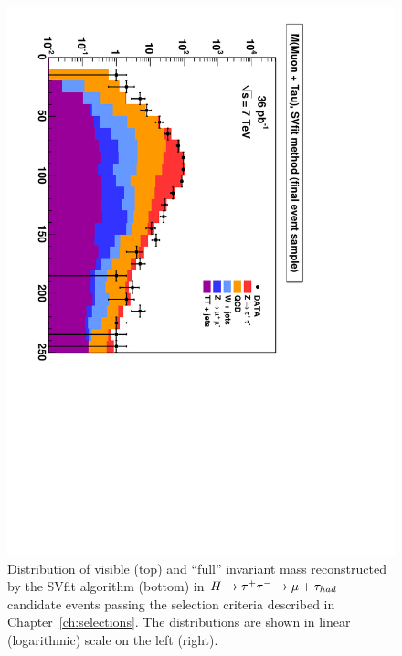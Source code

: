 \begin{figure}
\begin{center}
\includegraphics*[height=0.49\textwidth,angle=90]{results_chapter/figures/replotted_results/plotAHtoMuTauOS_inclusive_finalSamplePlots_mSVmethod.pdf}
\caption[Distributions of final selected events]{Distribution of visible (top)
and ``full'' \TT invariant mass reconstructed by the SVfit algorithm (bottom) in
\mbox{$H \to \tau^+\tau^- \to \mu + \tau_{had}$} candidate events passing the selection
criteria described in Chapter~\ref{ch:selections}.  The distributions are shown
in linear (logarithmic) scale on the left (right).}
\label{fig:AHtoMuTauPlotsLoose}
\end{center}
\end{figure} 

